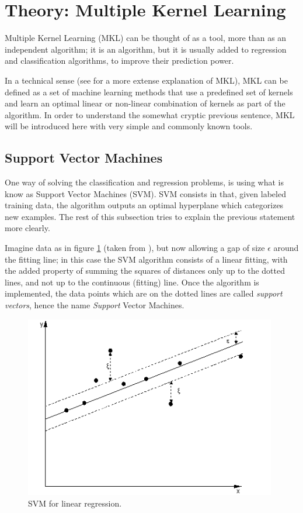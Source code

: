 \documentclass[paper=a4, fontsize=11pt]{scrartcl} %
\numberwithin{equation}{section} %
\numberwithin{figure}{section} %
\numberwithin{table}{section} %
\begin{document}
\section{Theory: Multiple Kernel Learning}

Multiple Kernel Learning (MKL) can be thought of as a tool, more than as an independent algorithm; it is an algorithm, but it is usually added to regression and classification algorithms, to improve their prediction power.

In a technical sense (see \cite{mehmet} for a more extense explanation of MKL), MKL can be defined as a set of machine learning methods that use a predefined set of kernels and learn an optimal linear or non-linear combination of kernels as part of the algorithm. In order to understand the somewhat cryptic previous sentence, MKL will be introduced here with very simple and commonly known tools.

\subsection{Support Vector Machines}

One way of solving the classification and regression problems, is using what is know as Support Vector Machines (SVM). SVM consists in that, given labeled training data, the algorithm outputs an optimal hyperplane which categorizes new examples. The rest of this subsection tries to explain the previous statement more clearly.

Imagine data as in figure \ref{fig:SVM_example1} (taken from \cite{svm_linear}), but now allowing a gap of size $\epsilon$ around the fitting line; in this case the SVM algorithm consists of a linear fitting, with the added property of summing the squares of distances only up to the dotted lines, and not up to the continuous (fitting) line. Once the algorithm is implemented, the data points which are on the dotted lines are called \textit{support vectors}, hence the name \textit{Support} Vector Machines.

\begin{figure}[t]
\includegraphics[width=11cm]{svm_exmpl}
\centering
\caption{SVM for linear regression.}
\label{fig:SVM_example1}
\end{figure}
\end{document}
